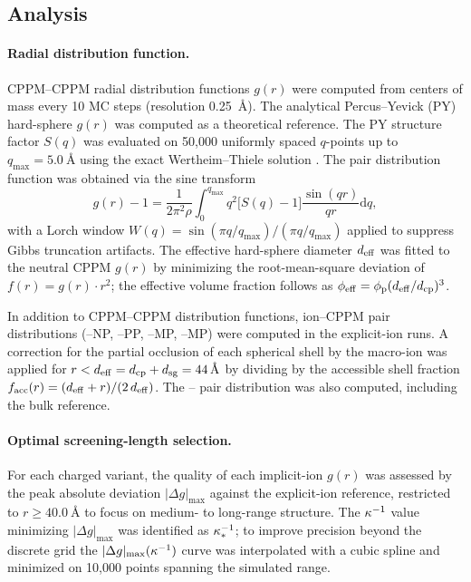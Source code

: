 \documentclass{article}
\begin{document}
\subsection{Analysis}

\paragraph{Radial distribution function.}

CPPM--CPPM radial distribution functions $g(r)$ were computed from centers of mass every 10 MC steps (resolution \qty{0.25}{\angstrom}).
The analytical Percus--Yevick (PY) hard-sphere $g(r)$ was computed as a theoretical reference.
The PY structure factor $S(q)$ was evaluated on 50,000 uniformly spaced $q$-points up to $q_\mathrm{max} = \qty{5.0}{\angstrom}$ using the exact Wertheim--Thiele solution \cite{Wertheim1963,Thiele1963}.
The pair distribution function was obtained via the sine transform
\begin{equation}
      g(r) - 1 = \frac{1}{2\pi^2\rho} \int_0^{q_\mathrm{max}} q^2\bigl[S(q)-1\bigr]\frac{\sin(qr)}{qr} \mathrm{d}q,
\end{equation}
with a Lorch window $W(q) = \sin(\pi q/q_\mathrm{max})/(\pi q/q_\mathrm{max})$ applied to suppress Gibbs truncation artifacts.
The effective hard-sphere diameter $d_{\mathrm{eff}}$ was fitted to the neutral CPPM $g(r)$ by minimizing the root-mean-square deviation of $f(r) = g(r)\cdot r^2$; the effective volume fraction follows as $\phi_{\mathrm{eff}} = \phi_\mathrm{p}(d_{\mathrm{eff}}/d_{\mathrm{cp}})^3$.

In addition to CPPM--CPPM distribution functions, ion--CPPM pair distributions (--NP, --PP, --MP, --MP) were computed in the explicit-ion runs.
A correction for the partial occlusion of each spherical shell by the macro-ion was applied for $r < d_{\mathrm{eff}} = d_{\mathrm{cp}} + d_{\mathrm{sg}} = \qty{44}{\angstrom}$ by dividing by the accessible shell fraction $f_\text{acc}(r) = (d_{\mathrm{eff}} + r)/(2\,d_{\mathrm{eff}})$.
The -- pair distribution was also computed, including the bulk  reference.

\paragraph{Optimal screening-length selection.}

For each charged variant, the quality of each implicit-ion $g(r)$ was assessed by the peak absolute deviation $|\Delta g|_\text{max}$ against the explicit-ion reference, restricted to $r \geq \qty{40.0}{\angstrom}$ to focus on medium- to long-range structure.
The $\kappa^{-1}$ value minimizing $|\Delta g|_\text{max}$ was identified as $\kappa^{-1}_*$; to improve precision beyond the discrete grid the $|\Delta g|_\text{max}(\kappa^{-1})$ curve was interpolated with a cubic spline and minimized on 10,000 points spanning the simulated range.
\end{document}

